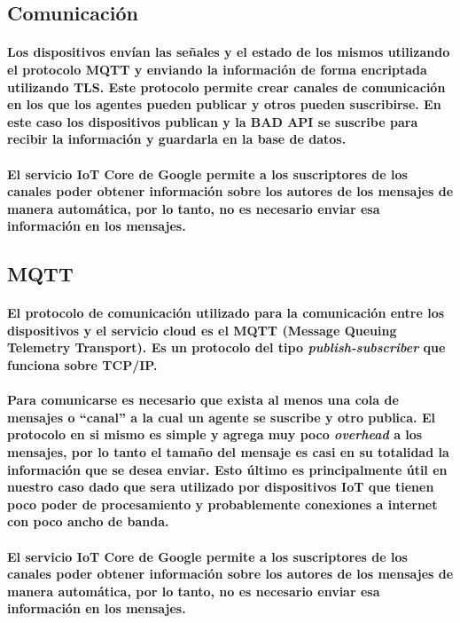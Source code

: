 \documentclass{article}
\begin{document}
\subsection{Comunicación}
\paragraph{
Los dispositivos envían las señales y el estado de los mismos utilizando el protocolo MQTT y enviando la información de forma encriptada utilizando TLS. Este protocolo permite crear canales de comunicación en los que los agentes pueden publicar y otros pueden suscribirse. En este caso los dispositivos publican y la BAD API se suscribe para recibir la información y guardarla en la base de datos.
}
\paragraph{
El servicio IoT Core de Google permite a los suscriptores de los canales poder obtener información sobre los autores de los mensajes de manera automática, por lo tanto, no es necesario enviar esa información en los mensajes.
}

\subsection{MQTT}
\paragraph{
El protocolo de comunicación utilizado para la comunicación entre los dispositivos y el servicio cloud es el MQTT (Message Queuing Telemetry Transport). Es un protocolo del tipo \textit{publish-subscriber} que funciona sobre TCP/IP.
}
\paragraph{
Para comunicarse es necesario que exista al menos una cola de mensajes o ``canal'' a la cual un agente se suscribe y otro publica. El protocolo en si mismo es simple y agrega muy poco \textit{overhead} a los mensajes, por lo tanto el tamaño del mensaje es casi en su totalidad la información que se desea enviar. Esto último es principalmente útil en nuestro caso dado que sera utilizado por dispositivos IoT que tienen poco poder de procesamiento y probablemente conexiones a internet con poco ancho de banda.
}
\paragraph{
El servicio IoT Core de Google permite a los suscriptores de los canales poder obtener información sobre los autores de los mensajes de manera automática, por lo tanto, no es necesario enviar esa información en los mensajes.
}
\end{document}
